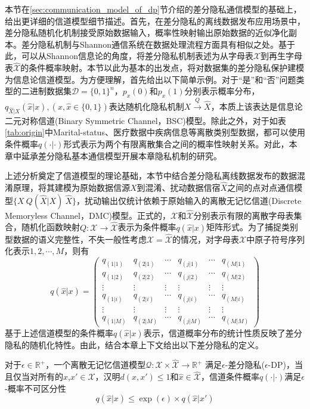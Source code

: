 本节在\ref{sec:communication_model_of_dp}节介绍的差分隐私通信模型的基础上，给出更详细的信道模型细节描述。首先，在差分隐私的离线数据发布应用场景中，差分隐私随机化机制接受原始数据输入，概率性映射输出原始数据的近似净化副本。差分隐私机制与Shannon通信系统在数据处理流程方面具有相似之处。基于此，可以从Shannon信息论的角度，将差分隐私机制表述为从字母表$\mathcal{X}$到再生字母表$\mathcal{\hat{X}}$的条件概率映射。本节以此为基本的出发点，将对数据集的差分隐私保护建模为信息论信道模型。为方便理解，首先给出以下简单示例。对于``是''和``否''问题类型的二进制数据集$\mathcal{D}=\{0,1\}^{n}$，$p_x(0)$和$p_x(1)$分别表示概率分布，$q_{\hat{X}|X}(\hat{x}|x),(x,\hat{x}\in \{0,1\})$表达随机化隐私机制$X\xrightarrow{Q} \hat{X}$，本质上该表达是信息论二元对称信道(Binary Symmetric Channel，BSC)模型。除此之外，对于如表\ref{tab:origin}中Marital-status、医疗数据中疾病信息等离散类别型数据，都可以使用条件概率$q(\cdot|\cdot)$形式表示为两个有限离散集合之间的概率性映射关系。对此，本章中延承差分隐私基本通信模型开展本章隐私机制的研究。

上述分析奠定了信道模型的理论基础，本节中结合差分隐私离线数据发布的数据混淆原理，将其建模为原始数据信源$X$到混淆、扰动数据信宿$\hat{X}$之间的点对点通信模型$\{X~Q(\hat{X}|X)~\hat{X}\}$，扰动输出仅统计依赖于原始输入的离散无记忆信道(Discrete Memoryless Channel，DMC)模型。正式的，$\mathcal{X}$和$\mathcal{\hat{X}}$分别表示有限的离散字母表集合，随机化函数映射$Q:\mathcal{X}\rightarrow\hat{\mathcal{X}}$表示为条件概率$q(\hat{x}|x)$矩阵形式。为了捕捉类别型数据的语义完整性，不失一般性考虑$\mathcal{X}=\hat{\mathcal{X}}$的情况，对字母表$\mathcal{X}$中原子符号序列化表示$1,2,\cdots,M$，则有
\begin{equation}\label{Eq:MRR_5.2.2}\nonumber
	q(\hat{x}|x)=\begin{pmatrix}
		q_{(1|1)}& q_{(2|1)}&\cdots &q_{(j|1)}&\cdots & q_{(M|1)}\\
		q_{(1|2)}& q_{(2|2)}&\cdots &q_{(j|2)}&\cdots & q_{(M|2)}\\
		\vdots & \vdots & \vdots &\vdots &\vdots & \vdots \\
		q_{(1|i)}  & q_{(2|i)} &\cdots & q_{(j|i)}& \cdots &q_{(M|i)}\\
		\vdots & \vdots & \vdots &\vdots &\vdots & \vdots \\
		q_{(1|M)}& q_{(2|M)}&\cdots &q_{(j|M)}&\cdots & q_{(M|M)}
	\end{pmatrix}
\end{equation}
基于上述信道模型的条件概率$q(\hat{x}|x)$表示，信道概率分布的统计性质反映了差分隐私的随机化特性。由此，结合本章上下文给出以下差分隐私的定义。
\begin{definition}\textup{\cite{alvim2011differential,wang2016on}}\label{def:chapter05-dp}对于$\epsilon \in \mathbb{R}^{+}$，一个离散无记忆信道模型$\mathcal{Q}:\mathcal{X}\times \mathcal{\hat{X}}\rightarrow \mathbb{R}^{+} $ 满足$\epsilon$-差分隐私($\epsilon$-DP)，当且仅当对所有的$x$,$x'\in \mathcal{X}$，汉明$d(x,x')\leq 1$和$\hat{x}\in \mathcal{\hat{X}}$，信道条件概率$q(\cdot|\cdot)$满足$\epsilon$-概率不可区分性
	\begin{equation}
		q(\hat{x}|x)\leq \exp (\epsilon) \times q(\hat{x}|x')
	\end{equation}
\end{definition}

